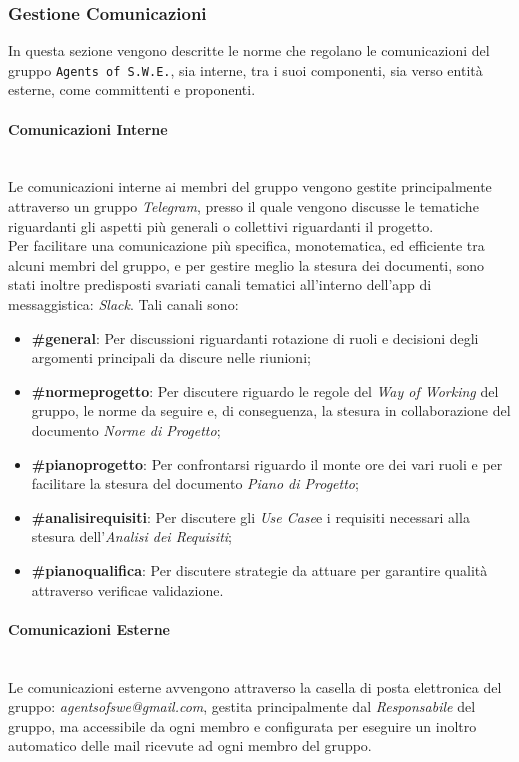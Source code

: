 \subsubsection{Gestione Comunicazioni}
	In questa sezione vengono descritte le norme che regolano le comunicazioni del gruppo \texttt{Agents of S.W.E.}, 		sia interne, tra i suoi componenti, sia verso entità esterne, come committenti e proponenti.

\paragraph{Comunicazioni Interne} ~\\
	Le comunicazioni interne ai membri del gruppo vengono gestite principalmente attraverso un gruppo 										\textit{Telegram}\glossario, presso il quale vengono discusse le tematiche riguardanti gli aspetti più generali o collettivi riguardanti il progetto. \\
	Per facilitare una comunicazione più specifica, monotematica, ed efficiente tra alcuni membri del gruppo, e per 			gestire meglio la stesura dei documenti, sono stati inoltre predisposti svariati canali tematici all'interno 				dell'app di messaggistica: \textit{Slack}\glossario. Tali canali sono:
	\begin{itemize}
	\item \textbf{\#general}: Per discussioni riguardanti rotazione di ruoli e decisioni degli argomenti principali 				da discure nelle riunioni;
	\item \textbf{\#normeprogetto}: Per discutere riguardo le regole del \textit{Way of Working} del gruppo, le norme 		da seguire e, di conseguenza, la stesura in collaborazione del documento \textit{Norme di Progetto}\glossario;
	\item \textbf{\#pianoprogetto}: Per confrontarsi riguardo il monte ore dei vari ruoli e per facilitare la stesura 		del documento \textit{Piano di Progetto}\glossario;
	\item \textbf{\#analisirequisiti}: Per discutere gli \textit{Use Case}\glossario e i requisiti necessari alla 				stesura dell'\textit{Analisi dei Requisiti};
	\item \textbf{\#pianoqualifica}: Per discutere strategie da attuare per garantire qualità attraverso 									verifica\glossario e validazione\glossario.
	\end{itemize}

\paragraph{Comunicazioni Esterne} ~\\
	Le comunicazioni esterne avvengono attraverso la casella di posta elettronica del gruppo: 														\textit{agentsofswe@gmail.com}, gestita principalmente dal \textit{Responsabile} del gruppo, ma accessibile da 			ogni membro e configurata per eseguire un inoltro automatico delle mail ricevute ad ogni membro del gruppo.


